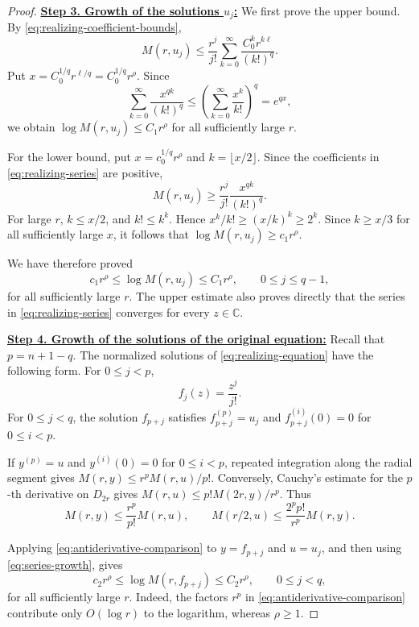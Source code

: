 \documentclass[12pt,letterpaper,reqno]{amsart}
\theoremstyle{definition}
\numberwithin{equation}{section}
\newcommand{\C}{\mathbb C}
\begin{document}
\begin{proof}
\medskip\noindent
\textbf{\underline{Step 3. Growth of the solutions \(u_j\):}}
We first prove the upper bound. By
\eqref{eq:realizing-coefficient-bounds},
\[
M(r,u_j)
\leq
\frac{r^j}{j!}
\sum_{k=0}^\infty
\frac{C_0^kr^{k\ell}}{(k!)^q}.
\]
Put \(x=C_0^{1/q}r^{\ell/q}=C_0^{1/q}r^\rho\). Since
\[
\sum_{k=0}^\infty\frac{x^{qk}}{(k!)^q}
\leq
\left(
\sum_{k=0}^\infty\frac{x^k}{k!}
\right)^q
=
e^{qx},
\]
we obtain \(\log M(r,u_j)\leq C_1r^\rho\) for all sufficiently large
\(r\).

For the lower bound, put
\(x=c_0^{1/q}r^\rho\) and
\(k=\lfloor x/2\rfloor\). Since the coefficients in
\eqref{eq:realizing-series} are positive,
\[
M(r,u_j)
\geq
\frac{r^j}{j!}
\frac{x^{qk}}{(k!)^q}.
\]
For large \(r\), \(k\leq x/2\), and \(k!\leq k^k\). Hence
\(x^k/k!\geq(x/k)^k\geq2^k\). Since
\(k\geq x/3\) for all sufficiently large \(x\), it follows that
\(\log M(r,u_j)\geq c_1r^\rho\).

We have therefore proved
\begin{equation}\label{eq:series-growth}
 c_1r^\rho
 \leq
 \log M(r,u_j)
 \leq
 C_1r^\rho,
 \qquad
 0\leq j\leq q-1,
\end{equation}
for all sufficiently large \(r\). The upper estimate also proves
directly that the series in \eqref{eq:realizing-series} converges for
every \(z\in\C\).


\medskip\noindent
\textbf{\underline{Step 4. Growth of the solutions of the original equation:}}
Recall that \(p={n+1}-q\). The normalized solutions of
\eqref{eq:realizing-equation} have the following form. For
\(0\leq j<p\),
\[
f_j(z)=\frac{z^j}{j!}.
\]
For \(0\leq j<q\), the solution \(f_{p+j}\) satisfies
\(f_{p+j}^{(p)}=u_j\) and
\(f_{p+j}^{(i)}(0)=0\) for \(0\leq i<p\).

If \(y^{(p)}=u\) and \(y^{(i)}(0)=0\) for \(0\leq i<p\), repeated
integration along the radial segment gives
\(M(r,y)\leq r^pM(r,u)/p!\).
Conversely, Cauchy's estimate for the \(p\)-th derivative on
\(D_{2r}\) gives
\(M(r,u)\leq p!M(2r,y)/r^p\). Thus
\begin{equation}\label{eq:antiderivative-comparison}
 M(r,y)
 \leq
 \frac{r^p}{p!}M(r,u),
 \qquad
 M(r/2,u)
 \leq
 \frac{2^pp!}{r^p}M(r,y).
\end{equation}

Applying \eqref{eq:antiderivative-comparison} to
\(y=f_{p+j}\) and \(u=u_j\), and then using
\eqref{eq:series-growth}, gives
\begin{equation}\label{eq:nonpolynomial-component-growth}
 c_2r^\rho
 \leq
 \log M(r,f_{p+j})
 \leq
 C_2r^\rho,
 \qquad
 0\leq j<q,
\end{equation}
for all sufficiently large \(r\). Indeed, the factors \(r^p\) in
\eqref{eq:antiderivative-comparison} contribute only \(O(\log r)\) to
the logarithm, whereas \(\rho\geq1\).


\end{proof}
\end{document}
